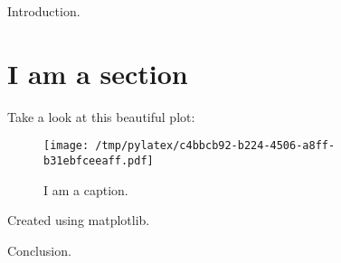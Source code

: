 \documentclass{article}%
\begin{document}
%
\normalsize%
Introduction.%
\section{I am a section}%
Take a look at this beautiful plot:%


\begin{figure}[htbp]%
\centering%
\texttt{[image: /tmp/pylatex/c4bbcb92-b224-4506-a8ff-b31ebfceeaff.pdf]}%
\caption{I am a caption.}%
\end{figure}

%
Created using matplotlib.

%
Conclusion.%
\end{document}
